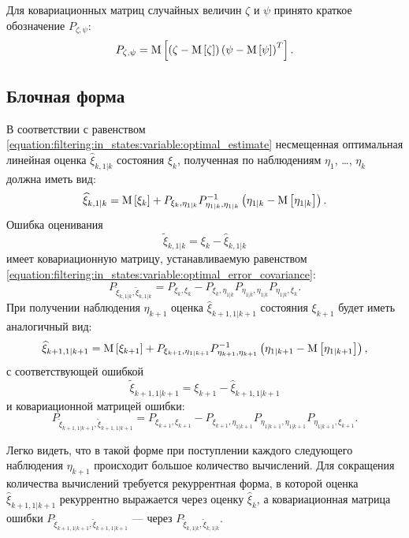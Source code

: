 Для ковариационных матриц случайных величин $\zeta$ и $\psi$ принято краткое обозначение $P_{\zeta, \psi}$:
$$
	P_{\zeta, \psi} = \mathrm{M} \left [ \left ( \zeta - \mathrm{M} \left [ \zeta \right ] \right ) \left ( \psi - \mathrm{M} \left [ \psi \right ] \right )^T \right ] .
$$

\subsection{Блочная форма}

В соответствии с равенством \eqref{equation:filtering:in_states:variable:optimal_estimate} несмещенная оптимальная линейная оценка $\widehat{\xi}_{k,1|k}$ состояния $\xi_k$,
полученная по наблюдениям $\eta_1$, \dots, $\eta_k$ должна иметь вид:
\begin{equation} \label{equation:filtering:in_states:process:block:current_state_estimate}
	\widehat{\xi}_{k,1|k} = \mathrm{M} \left [ \xi_k \right ] + P_{\xi_k, \eta_{1|k}} P_{\eta_{1|k}, \eta_{1|k}}^{-1} \left ( \eta_{1|k} - \mathrm{M} \left [ \eta_{1|k} \right ] \right )
	.
\end{equation}
Ошибка оценивания
$$
	\widetilde{\xi}_{k,1|k} = \xi_k - \widehat{\xi}_{k,1|k}
$$
имеет ковариационную матрицу, устанавливаемую равенством \eqref{equation:filtering:in_states:variable:optimal_error_covariance}:
\begin{equation} \label{equation:filtering:in_states:process:block:current_state_estimate_error_covariance}
	P_{\widetilde{\xi}_{k,1|k}, \widetilde{\xi}_{k,1|k}} = P_{\xi_k, \xi_k} - P_{\xi_k, \eta_{1|k}} P_{\eta_{1|k}, \eta_{1|k}} P_{\eta_{1|k}, \xi_k}
	.
\end{equation}
При получении наблюдения $\eta_{k+1}$ оценка $\widehat{\xi}_{k+1, 1|k+1}$ состояния $\xi_{k+1}$ будет иметь аналогичный вид:
$$
	\widehat{\xi}_{k+1, 1|k+1} = \mathrm{M} \left [ \xi_{k+1} \right ] + P_{\xi_{k+1}, \eta_{1|k+1}} P_{\eta_{k+1}, \eta_{k+1}}^{-1} \left ( \eta_{1|k+1} - \mathrm{M} \left [ \eta_{1|k+1} \right ] \right )
	,
$$
с соответствующей ошибкой
$$
	\widetilde{\xi}_{k+1, 1|k+1} = \xi_{k+1} - \widehat{\xi}_{k+1, 1|k+1}
$$
и ковариационной матрицей ошибки:
$$
	P_{\widetilde{\xi}_{k+1,1|k+1}, \widetilde{\xi}_{k+1,1|k+1}} = P_{\xi_{k+1}, \xi_{k+1}} - P_{\xi_{k+1}, \eta_{1|k+1}} P_{\eta_{1|k+1}, \eta_{1|k+1}} P_{\eta_{1|k+1}, \xi_{k+1}}
	.
$$

Легко видеть, что в такой форме при поступлении каждого следующего наблюдения $\eta_{k+1}$ происходит большое количество вычислений. Для сокращения количества
вычислений требуется рекуррентная форма, в которой оценка $\widehat{\xi}_{k+1, 1|k+1}$ рекуррентно выражается через оценку $\widehat{\xi}_k$, а ковариационная матрица
ошибки $P_{\widetilde{\xi}_{k+1,1|k+1}, \widetilde{\xi}_{k+1,1|k+1}}$ --- через $P_{\widetilde{\xi}_{k,1|k}, \widetilde{\xi}_{k,1|k}}$.

